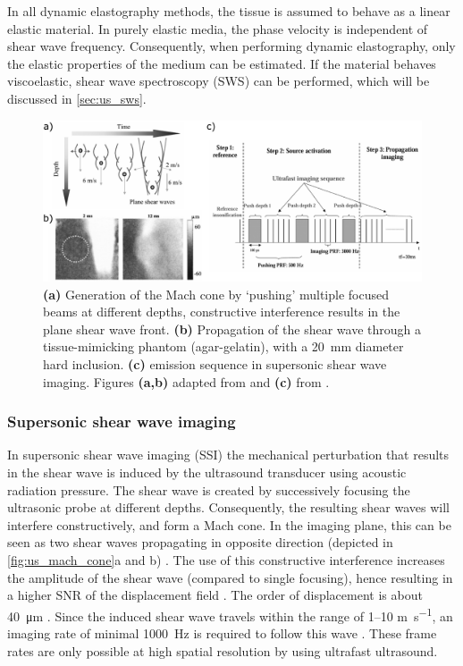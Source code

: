 In all dynamic elastography methods, the tissue is assumed to behave as a linear elastic material. In purely elastic media, the phase velocity is independent of shear wave frequency. Consequently, when performing dynamic elastography, only the elastic properties of the medium can be estimated. If the material behaves viscoelastic, shear wave spectroscopy (SWS) can be performed, which will be discussed in \autoref{sec:us_sws}.




\begin{figure}[t]
    \centering
    \includegraphics[width=\linewidth]{Figures/Ultrasound/us_shear_wave_imaging.pdf}
    \caption{\textbf{(a)} Generation of the Mach cone by `pushing' multiple focused beams at different depths, constructive interference results in the plane shear wave front. \textbf{(b)} Propagation of the shear wave through a tissue-mimicking phantom (agar-gelatin), with a \SI{20}{\milli\meter} diameter hard inclusion. \textbf{(c)} emission sequence in supersonic shear wave imaging. Figures \textbf{(a,b)} adapted from \citet{bercoff_sonic_2004} and \textbf{(c)} from \citet{bercoff_supersonic_2004}.}
    \label{fig:us_mach_cone}
\end{figure}

\subsubsection{Supersonic shear wave imaging}
In supersonic shear wave imaging (SSI) the mechanical perturbation that results in the shear wave is induced by the ultrasound transducer using acoustic radiation pressure. The shear wave is created by successively focusing the ultrasonic probe at different depths. Consequently, the resulting shear waves will interfere constructively, and form a Mach cone. In the imaging plane, this can be seen as two shear waves propagating in opposite direction (depicted in \autoref{fig:us_mach_cone}a and b) \cite{bercoff_sonic_2004}. The use of this constructive interference increases the amplitude of the shear wave (compared to single focusing), hence resulting in a higher SNR of the displacement field \cite{gennisson_ultrasound_2013}. The order of displacement is about \SI{40}{\micro\meter} \cite{bercoff_sonic_2004}. Since the induced shear wave travels within the range of 1--10 \si{\meter\per\second}, an imaging rate of minimal \SI{1000}{\hertz} is required to follow this wave \cite{minin_ultrafast_2011}. These frame rates are only possible at high spatial resolution by using ultrafast ultrasound. 

